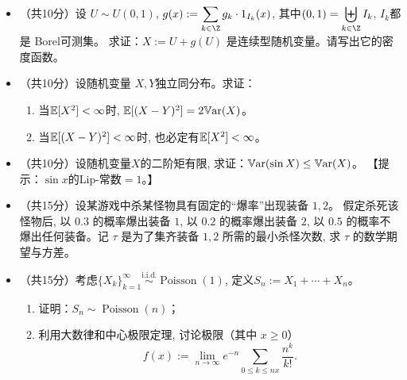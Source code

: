 \begin{itemize}
\begin{enumerate}
        \end{enumerate}
        \item [三、]（共10分）设 $U \sim U(0, 1)$, 
        $\displaystyle g(x) := \sum_{k \in \Z} g_k\cdot 1_{I_k}(x)$, 
        其中$\displaystyle (0,1) = \biguplus_{k \in \Z} I_k$, 
        $I_k$都是 Borel可测集。
        求证：$X := U + g(U)$ 是连续型随机变量。请写出它的密度函数。
        \item [四、]（共10分）设随机变量 $X, Y $独立同分布。求证：
        \begin{enumerate}
            \item [(1)]当$ \mathbb{E}[X^2] < \infty$时, $\mathbb{E}[(X-Y)^2] = 2\mathbb{V}\mathrm{ar}(X)$。
            \item [(2)]当$ \mathbb{E}[(X-Y)^2] < \infty$时, 也必定有$\mathbb{E}[X^2] < \infty$。
        \end{enumerate}
        \item [五、]（共10分）设随机变量$X$的二阶矩有限, 求证：$\mathbb{V}\mathrm{ar}(\sin X) \le \mathbb{V}\mathrm{ar}(X)$。
        【提示：$\sin x$的Lip-常数$=1$。】
        \item [六、]（共15分）设某游戏中杀某怪物具有固定的“爆率”出现装备 $1, 2$。
        假定杀死该怪物后, 以 $0.3$ 的概率爆出装备 $1$, 以 $0.2$ 的概率爆出装备 $2$, 
        以 $0.5$ 的概率不爆出任何装备。记 $\tau$ 是为了集齐装备 $1, 2$ 所需的最小杀怪次数, 
        求 $\tau$ 的数学期望与方差。
        \item [七、]（共15分）考虑$\{X_k\}_{k=1}^\infty 
        \overset{\text{i.i.d.}}{\sim} \operatorname{Poisson}(1)$, 
        定义$S_n:=X_1+\cdots+X_n$。
        \begin{enumerate}
            \item [(1)]证明：$S_n \sim \operatorname{Poisson}(n)$；
            \item [(2)] 利用大数律和中心极限定理, 讨论极限（其中 $x \ge 0$）
            \[ f(x):= \lim_{n\to \infty} e^{-n} 
            \sum_{0\le k \le nx} \frac{n^k}{k!}.\]
        \end{enumerate}
\end{itemize}


